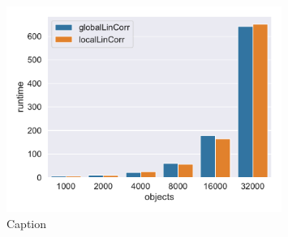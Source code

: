 \begin{figure}[h]
    \centering
    \includegraphics[width=0.8\textwidth]{evaluation/per_objects/Avg_Runtime_3D_N5_pobjects_bar.pdf}
    \caption{Caption}
    \label{fig:eval_per_objects}   
\end{figure}

